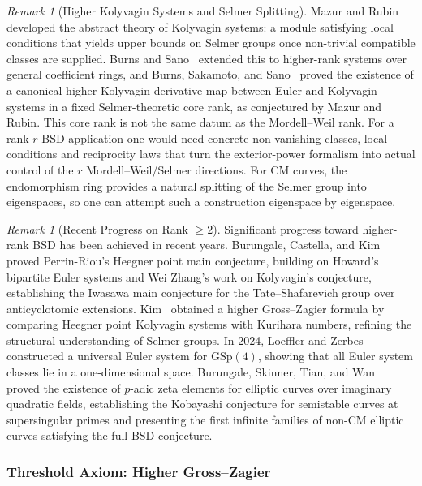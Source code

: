 \documentclass[aps,prd,twocolumn,superscriptaddress,nofootinbib,floatfix]{revtex4-2}
\theoremstyle{definition}
\theoremstyle{remark}
\newtheorem{remark}[theorem]{Remark}
\begin{document}
\begin{remark}[Higher Kolyvagin Systems and Selmer Splitting]
\label{rem:kolyvagin-higher}
Mazur and Rubin~\cite{MazurRubin2004} developed the abstract theory of Kolyvagin systems: a module satisfying local conditions that yields upper bounds on Selmer groups once non-trivial compatible classes are supplied. Burns and Sano~\cite{BurnsSano2021} extended this to higher-rank systems over general coefficient rings, and Burns, Sakamoto, and Sano~\cite{BurnsSakamotoSano2025} proved the existence of a canonical higher Kolyvagin derivative map between Euler and Kolyvagin systems in a fixed Selmer-theoretic core rank, as conjectured by Mazur and Rubin. This core rank is not the same datum as the Mordell--Weil rank. For a rank-$r$ BSD application one would need concrete non-vanishing classes, local conditions and reciprocity laws that turn the exterior-power formalism into actual control of the $r$ Mordell--Weil/Selmer directions. For CM curves, the endomorphism ring provides a natural splitting of the Selmer group into eigenspaces, so one can attempt such a construction eigenspace by eigenspace.
\end{remark}

\begin{remark}[Recent Progress on Rank $\geq 2$]\label{rem:recent-bsd}
Significant progress toward higher-rank BSD has been achieved in recent years. Burungale, Castella, and Kim~\cite{BurungaleCastellaKim2021} proved Perrin-Riou's Heegner point main conjecture, building on Howard's bipartite Euler systems and Wei Zhang's work on Kolyvagin's conjecture, establishing the Iwasawa main conjecture for the Tate--Shafarevich group over anticyclotomic extensions. Kim~\cite{Kim2024} obtained a higher Gross--Zagier formula by comparing Heegner point Kolyvagin systems with Kurihara numbers, refining the structural understanding of Selmer groups. In 2024, Loeffler and Zerbes~\cite{LoefflerZerbes2024} constructed a universal Euler system for $\mathrm{GSp}(4)$, showing that all Euler system classes lie in a one-dimensional space. Burungale, Skinner, Tian, and Wan~\cite{BSTW2024} proved the existence of $p$-adic zeta elements for elliptic curves over imaginary quadratic fields, establishing the Kobayashi conjecture for semistable curves at supersingular primes and presenting the first infinite families of non-CM elliptic curves satisfying the full BSD conjecture.
\end{remark}

\subsubsection*{Threshold Axiom: Higher Gross--Zagier}
\end{document}
